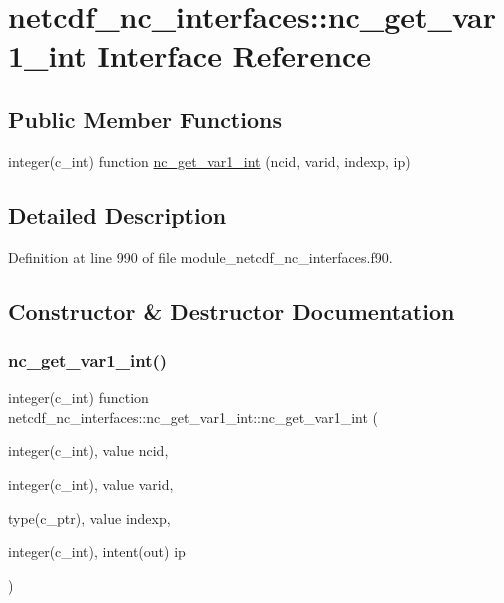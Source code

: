 \hypertarget{interfacenetcdf__nc__interfaces_1_1nc__get__var1__int}{}\section{netcdf\+\_\+nc\+\_\+interfaces\+:\+:nc\+\_\+get\+\_\+var1\+\_\+int Interface Reference}
\label{interfacenetcdf__nc__interfaces_1_1nc__get__var1__int}
\subsection*{Public Member Functions}
\begin{DoxyCompactItemize}
\item 
integer(c\+\_\+int) function \hyperlink{interfacenetcdf__nc__interfaces_1_1nc__get__var1__int_aba3bd2e0dfce99760a4faa22bc6c7bcf}{nc\+\_\+get\+\_\+var1\+\_\+int} (ncid, varid, indexp, ip)
\end{DoxyCompactItemize}


\subsection{Detailed Description}


Definition at line 990 of file module\+\_\+netcdf\+\_\+nc\+\_\+interfaces.\+f90.



\subsection{Constructor \& Destructor Documentation}
\mbox{\label{interfacenetcdf__nc__interfaces_1_1nc__get__var1__int_aba3bd2e0dfce99760a4faa22bc6c7bcf}} 
\subsubsection{\texorpdfstring{nc\+\_\+get\+\_\+var1\+\_\+int()}{nc\_get\_var1\_int()}}
{\footnotesize\ttfamily integer(c\+\_\+int) function netcdf\+\_\+nc\+\_\+interfaces\+::nc\+\_\+get\+\_\+var1\+\_\+int\+::nc\+\_\+get\+\_\+var1\+\_\+int (\begin{DoxyParamCaption}\item[{integer(c\+\_\+int), value}]{ncid,  }\item[{integer(c\+\_\+int), value}]{varid,  }\item[{type(c\+\_\+ptr), value}]{indexp,  }\item[{integer(c\+\_\+int), intent(out)}]{ip }\end{DoxyParamCaption})}



